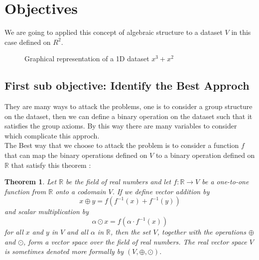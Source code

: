 \documentclass{article}
\newtheorem{theorem}{Theorem}[section]
\begin{document}
\section{Objectives}
    We are going to applied this concept of algebraic structure
    to a dataset $V$ in this case defined on $R^2$. 
    \begin{figure}[h]
    \centering
    \caption{Graphical representation of a 1D dataset $x^3 + x^2$ }
    \end{figure}
    \subsection{First sub objective: Identify the Best Approch}




        
    They are many ways to attack the problems, one is to consider a group structure on the dataset, then we can define a binary operation on the dataset such that it satisfies the group axioms.
    By this way there are many variables to consider which complicate this approch.
    \\
    The Best way that we choose to attack the problem  is to consider a function $f$ that can map the binary operations defined on $V$ to a binary operation defined on $\mathbb{R}$ that satisfy this theorem :
    \\
        \begin{theorem}\label{thm:1}
            \rm{Let $\mathbb{R}$ be the field of real numbers and let $f: \mathbb{R} \rightarrow V$ be a one-to-one function from $\mathbb{R}$ onto a codomain $V$. If we define vector addition by
            $$
            x \oplus y=f\left(f^{-1}(x)+f^{-1}(y)\right)
            $$
            and scalar multiplication by
            $$
            \alpha \odot x=f\left(\alpha \cdot f^{-1}(x)\right)
            $$
            for all $x$ and $y$ in $V$ and all $\alpha$ in $\mathbb{R}$, then the set $V$, together with the operations $\oplus$ and $\odot$, form a vector space over the field of real numbers.
            The real vector space $V$ is sometimes denoted more formally by $(V, \oplus, \odot)$.}
        \end{theorem}
\end{document}
